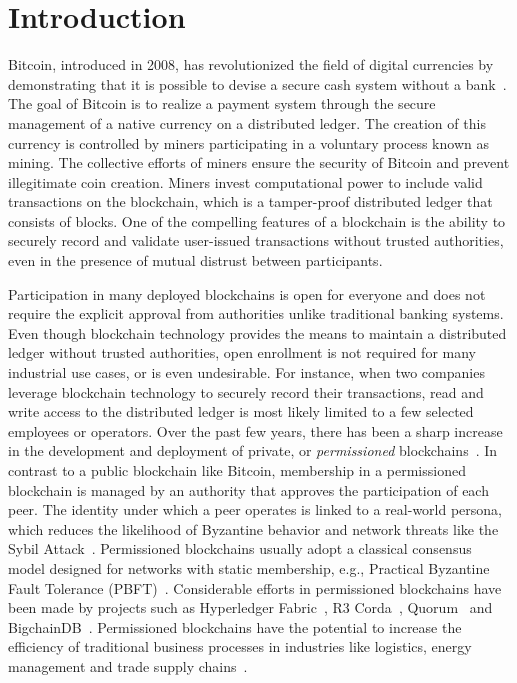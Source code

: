\section{Introduction}
Bitcoin, introduced in 2008, has revolutionized the field of digital currencies by demonstrating that it is possible to devise a secure cash system without a bank~\cite{nakamoto2008bitcoin}.
The goal of Bitcoin is to realize a payment system through the secure management of a native currency on a distributed ledger.
The creation of this currency is controlled by miners participating in a voluntary process known as mining.
The collective efforts of miners ensure the security of Bitcoin and prevent illegitimate coin creation.
Miners invest computational power to include valid transactions on the blockchain, which is a tamper-proof distributed ledger that consists of blocks.
One of the compelling features of a blockchain is the ability to securely record and validate user-issued transactions without trusted authorities, even in the presence of mutual distrust between participants.

Participation in many deployed blockchains is open for everyone and does not require the explicit approval from authorities unlike traditional banking systems.
Even though blockchain technology provides the means to maintain a distributed ledger without trusted authorities, open enrollment is not required for many industrial use cases, or is even undesirable.
For instance, when two companies leverage blockchain technology to securely record their transactions, read and write access to the distributed ledger is most likely limited to a few selected employees or operators.
Over the past few years, there has been a sharp increase in the development and deployment of private, or \emph{permissioned} blockchains~\cite{androulaki2018hyperledger,de2018pbft,vukolic2017rethinking}.
In contrast to a public blockchain like Bitcoin, membership in a permissioned blockchain is managed by an authority that approves the participation of each peer.
The identity under which a peer operates is linked to a real-world persona, which reduces the likelihood of Byzantine behavior and network threats like the Sybil Attack~\cite{douceur2002sybil}.
Permissioned blockchains usually adopt a classical consensus model designed for networks with static membership, e.g., Practical Byzantine Fault Tolerance (PBFT)~\cite{castro1999practical}.
Considerable efforts in permissioned blockchains have been made by projects such as Hyperledger Fabric~\cite{androulaki2018hyperledger}, R3 Corda~\cite{brown2016introducing}, Quorum~\cite{mogan2018quorum} and BigchainDB~\cite{mcconaghy2016bigchaindb}.
Permissioned blockchains have the potential to increase the efficiency of traditional business processes in industries like logistics, energy management and trade supply chains~\cite{vukolic2017rethinking}.

